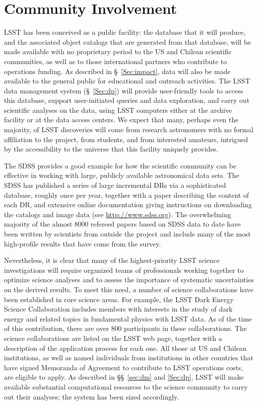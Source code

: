 \section{Community Involvement}
\label{Sec:community}

LSST has been conceived as a public facility: the database that it will
produce, and the associated object catalogs that are generated from that
database, will be made available with no proprietary period to the
US and Chilean scientific communities, as well as to those
international partners who contribute to operations funding.  As
described in \S~\ref{Sec:impact}, data will also be made available to
the general public for educational and outreach activities.
The LSST data management
system (\S~\ref{Sec:dp}) will provide user-friendly tools to access this database, support
user-initiated queries and data exploration, and carry out scientific analyses on the
data, using LSST computers either at the archive facility
or at the data access centers.
We expect that many, perhaps even the majority,
of LSST discoveries will come from research astronomers with no formal
affiliation to the project, from students, and from interested amateurs,
intrigued by the accessibility to the universe that this facility uniquely
provides.

The SDSS provides a good example for how the scientific
community can be effective in working with large, publicly available
astronomical data sets. The SDSS has published a series of large incremental
DRs via a sophisticated database, roughly once per year, together with
a paper describing the content of each DR, and extensive online
documentation giving instructions on downloading the catalogs and image data
(see \url{http://www.sdss.org}). The overwhelming majority of the almost
8000 refereed papers based
on SDSS data to date have been written by scientists from outside
the project and include many of the most high-profile results that have come
from the survey.

Nevertheless, it is clear that many of the highest-priority LSST science
investigations will require organized teams of professionals working together
to optimize science analyses and to assess the importance of systematic
uncertainties on the derived results. To meet this need, a number of science
collaborations have been established in core science
areas. For example, the LSST Dark Energy Science Collaboration includes
members with interests in the study of dark energy and related topics in
fundamental physics with LSST data. As of the time of this contribution, there are
over 800 participants in these collaborations. %
The science collaborations are listed on the LSST web page, together
with a description of the application process for each one.
All those at US and Chilean institutions,
as well as named individuals from institutions in other countries
that have signed Memoranda of Agreement to contribute to LSST
operations costs, are eligible to apply. As described in
\S\S~\ref{sec:dm} and \ref{Sec:dp}, LSST will make available
substantial computational resources to the
science community to carry out their analyses;
the system has been sized accordingly.

